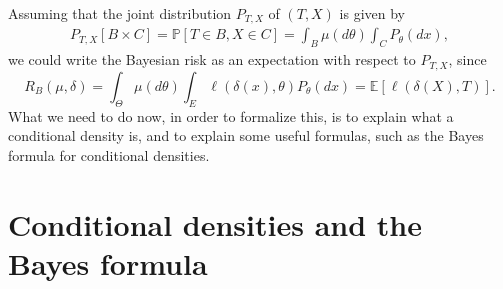\documentclass[
	fontsize=11pt, %
	twoside=false, %
	numbers=noenddot, %
]{kaobook}
\renewcommand{\P}{\mathbb P}
\newcommand{\E}{\mathbb E}
\begin{document}
Assuming that the joint distribution $P_{T, X}$ of $(T, X)$ is given by
\begin{align*}
	P_{T, X}[B \times C] = \P[ T \in B, X \in C] = \int_B \mu(d \theta) \int_C P_\theta(dx),
\end{align*}
we could write the Bayesian risk as an expectation with respect to $P_{T, X}$, since
\begin{equation*}
	R_B(\mu, \delta) = \int_{\Theta} \mu(d \theta) \int_E \ell(\delta(x), \theta) P_\theta(dx) = \E[ \ell(\delta(X), T)].
\end{equation*}
What we need to do now, in order to formalize this, is to explain what a conditional density is, and to explain some useful formulas, such as the Bayes formula for conditional densities.

\section{Conditional densities and the Bayes formula} %
\label{sec:about_conditional_distributions_and_densities}
\end{document}

